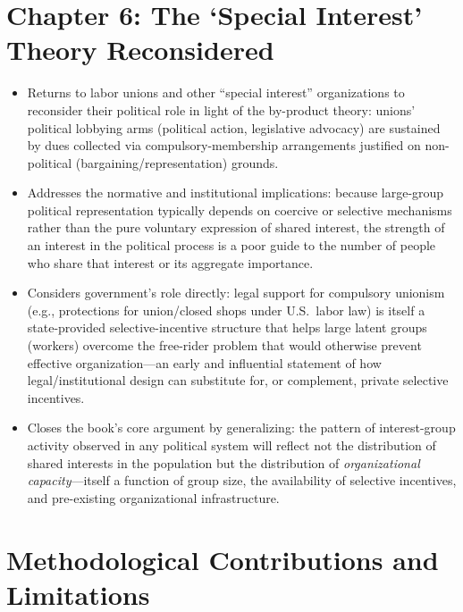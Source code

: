 \documentclass[12pt]{article}
\begin{document}
\section{Chapter 6: The `Special Interest' Theory Reconsidered}

\begin{itemize}[leftmargin=*, itemsep=4pt]
    \item Returns to labor unions and other ``special interest'' organizations to reconsider their political role in light of the by-product theory: unions' political lobbying arms (political action, legislative advocacy) are sustained by dues collected via compulsory-membership arrangements justified on non-political (bargaining/representation) grounds.
    \item Addresses the normative and institutional implications: because large-group political representation typically depends on coercive or selective mechanisms rather than the pure voluntary expression of shared interest, the strength of an interest in the political process is a poor guide to the number of people who share that interest or its aggregate importance.
    \item Considers government's role directly: legal support for compulsory unionism (e.g., protections for union/closed shops under U.S.\ labor law) is itself a state-provided selective-incentive structure that helps large latent groups (workers) overcome the free-rider problem that would otherwise prevent effective organization---an early and influential statement of how legal/institutional design can substitute for, or complement, private selective incentives.
    \item Closes the book's core argument by generalizing: the pattern of interest-group activity observed in any political system will reflect not the distribution of shared interests in the population but the distribution of \emph{organizational capacity}---itself a function of group size, the availability of selective incentives, and pre-existing organizational infrastructure.
\end{itemize}

\section{Methodological Contributions and Limitations}
\end{document}
